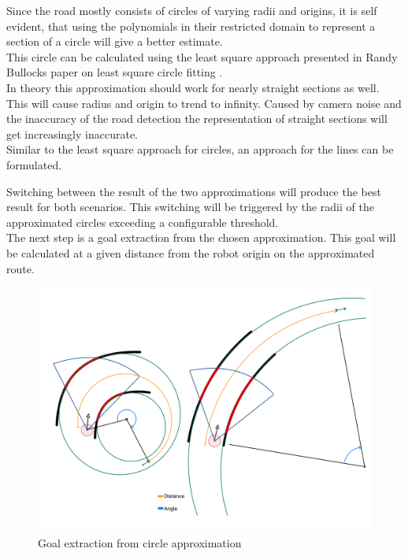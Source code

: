 Since the road mostly consists of circles of varying radii and origins, it is self evident, that using the polynomials in their restricted domain to represent a section of a circle will give a better estimate.\\
This circle can be calculated using the least square approach presented in Randy Bullocks paper on least square circle fitting \cite{leastsquarecircle}.\\

In theory this approximation should work for nearly straight sections as well. This will cause radius and origin to trend to infinity. Caused by camera noise and the inaccuracy of the road detection the representation of straight sections will get increasingly inaccurate.\\

Similar to the least square approach for circles, an approach for the lines can be formulated.

Switching between the result of the two approximations will produce the best result for both scenarios. This switching will be triggered by the radii of the approximated circles exceeding a configurable threshold.\\

The next step is a goal extraction from the chosen approximation. This goal will be calculated at a given distance from the robot origin on the approximated route.
 
\begin{figure} 
	\centering
	\includegraphics[width=\textwidth]{Pictures/goal finding}
	\caption{Goal extraction from circle approximation}
	\label{goalfinding}
\end{figure}

